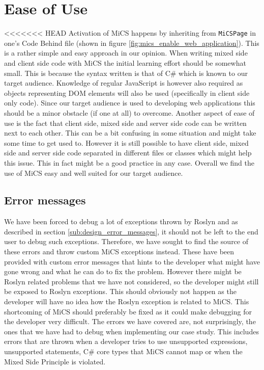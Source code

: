 \section{Ease of Use} %
\label{sec:ease_of_use}
<<<<<<< HEAD
	Activation of MiCS happens by inheriting from \texttt{MiCSPage} in one's Code Behind file (shown in figure \ref{fig:mics_enable_web_application}). This is a rather simple and easy approach in our opinion. When writing mixed side and client side code with MiCS the initial learning effort should be somewhat small. This is because the syntax written is that of C\# which is known to our target audience. Knowledge of regular JavaScript is however also required as objects representing DOM elements will also be used (specifically in client side only code). Since our target audience is used to developing web applications this should be a minor obstacle (if one at all) to overcome. Another aspect of ease of use is the fact that client side, mixed side and server side code can be written next to each other. This can be a bit confusing in some situation and might take some time to get used to. However it is still possible to have client side, mixed side and server side code separated in different files or classes which might help this issue. This in fact might be a good practice in any case. Overall we find the use of MiCS easy and well suited for our target audience.

	\subsection{Error messages} %
	\label{sub:evaluation_of_error_messages}
		We have been forced to debug a lot of exceptions thrown by Roslyn and as described in section \ref{sub:design_error_messages}, it should not be left to the end user to debug such exceptions. Therefore, we have sought to find the source of these errors and throw custom MiCS exceptions instead. These have been provided with custom error messages that hints to the developer what might have gone wrong and what he can do to fix the problem. However there might be Roslyn related problems that we have not considered, so the developer might still be exposed to Roslyn exceptions. This should obviously not happen as the developer will have no idea how the Roslyn exception is related to MiCS. This shortcoming of MiCS should preferably be fixed as it could make debugging for the developer very difficult. The errors we have covered are, not surprisingly, the ones that we have had to debug when implementing our case study. This includes errors that are thrown when a developer tries to use unsupported expressions, unsupported statements, C\# core types that MiCS cannot map or when the Mixed Side Principle is violated.

	

